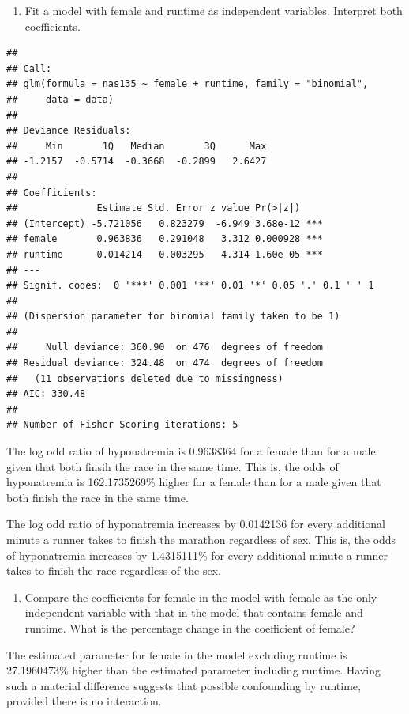 \documentclass[]{article}
\begin{document}
\begin{enumerate}
\def\labelenumi{\alph{enumi}.}
\setcounter{enumi}{5}
\itemsep1pt\parskip0pt
\item
  Fit a model with female and runtime as independent variables.
  Interpret both coefficients.
\end{enumerate}

\begin{verbatim}
## 
## Call:
## glm(formula = nas135 ~ female + runtime, family = "binomial", 
##     data = data)
## 
## Deviance Residuals: 
##     Min       1Q   Median       3Q      Max  
## -1.2157  -0.5714  -0.3668  -0.2899   2.6427  
## 
## Coefficients:
##              Estimate Std. Error z value Pr(>|z|)    
## (Intercept) -5.721056   0.823279  -6.949 3.68e-12 ***
## female       0.963836   0.291048   3.312 0.000928 ***
## runtime      0.014214   0.003295   4.314 1.60e-05 ***
## ---
## Signif. codes:  0 '***' 0.001 '**' 0.01 '*' 0.05 '.' 0.1 ' ' 1
## 
## (Dispersion parameter for binomial family taken to be 1)
## 
##     Null deviance: 360.90  on 476  degrees of freedom
## Residual deviance: 324.48  on 474  degrees of freedom
##   (11 observations deleted due to missingness)
## AIC: 330.48
## 
## Number of Fisher Scoring iterations: 5
\end{verbatim}

The log odd ratio of hyponatremia is 0.9638364 for a female than for a
male given that both finsih the race in the same time. This is, the odds
of hyponatremia is 162.1735269\% higher for a female than for a male
given that both finish the race in the same time.

The log odd ratio of hyponatremia increases by 0.0142136 for every
additional minute a runner takes to finish the marathon regardless of
sex. This is, the odds of hyponatremia increases by 1.4315111\% for
every additional minute a runner takes to finish the race regardless of
the sex.

\begin{enumerate}
\def\labelenumi{\alph{enumi}.}
\setcounter{enumi}{6}
\itemsep1pt\parskip0pt
\item
  Compare the coefficients for female in the model with female as the
  only independent variable with that in the model that contains female
  and runtime. What is the percentage change in the coefficient of
  female?
\end{enumerate}

The estimated parameter for female in the model excluding runtime is
27.1960473\% higher than the estimated parameter including runtime.
Having such a material difference suggests that possible confounding by
runtime, provided there is no interaction.
\end{document}

